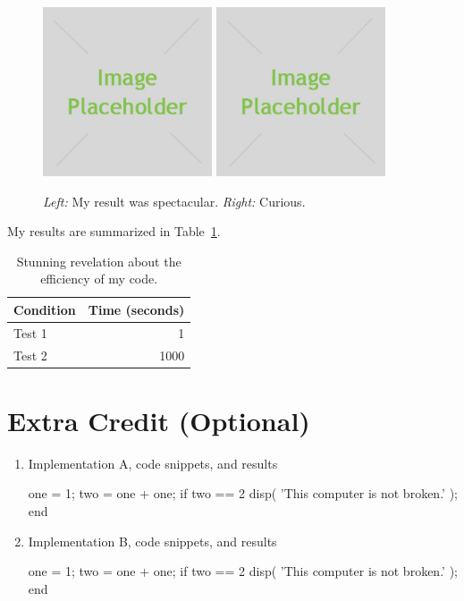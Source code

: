 \begin{figure}[h]
    \centering
    \includegraphics[width=5cm]{placeholder.jpg}
    \includegraphics[width=5cm]{placeholder.jpg}
    \caption{\emph{Left:} My result was spectacular. \emph{Right:} Curious.}
    \label{fig:result1}
\end{figure}

My results are summarized in Table~\ref{tab:table1}.

\begin{table}[h]
    \centering
    \begin{tabular}{lr}
        \toprule
        Condition & Time (seconds) \\
        \midrule
        Test 1 & 1 \\
        Test 2 & 1000 \\
        \bottomrule
    \end{tabular}
    \caption{Stunning revelation about the efficiency of my code.}
    \label{tab:table1}
\end{table}

\section*{Extra Credit (Optional)}
\begin{enumerate}
   
    \item Implementation A, code snippets, and results
        \begin{python}
        one = 1;
        two = one + one;
        if two == 2
            disp( 'This computer is not broken.' );
        end
        \end{python}
    
    \item Implementation B, code snippets, and results
        \begin{python}
        one = 1;
        two = one + one;
        if two == 2
            disp( 'This computer is not broken.' );
        end
        \end{python}
\end{enumerate}


